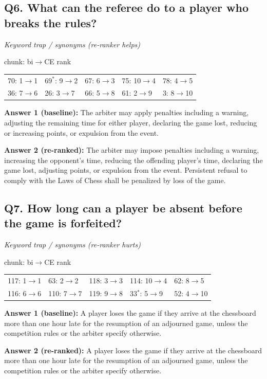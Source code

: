 \subsection*{Q6. What can the referee do to a player who breaks the rules?}
\emph{Keyword trap / synonyms (re-ranker helps)}\par
{\small chunk: bi$\to$CE rank\par\smallskip \begin{tabular}{@{}lllll@{}}
70: 1$\to$1 & 69$^*$: 9$\to$2 & 67: 6$\to$3 & 75: 10$\to$4 & 78: 4$\to$5 \\
36: 7$\to$6 & 26: 3$\to$7 & 66: 5$\to$8 & 61: 2$\to$9 & 3: 8$\to$10
\end{tabular}}\par\smallskip
\textbf{Answer 1 (baseline):} The arbiter may apply penalties including a warning, adjusting the remaining time for either player, declaring the game lost, reducing or increasing points, or expulsion from the event.\par
\textbf{Answer 2 (re-ranked):} The arbiter may impose penalties including a warning, increasing the opponent's time, reducing the offending player's time, declaring the game lost, adjusting points, or expulsion from the event. Persistent refusal to comply with the Laws of Chess shall be penalized by loss of the game.\par

\subsection*{Q7. How long can a player be absent before the game is forfeited?}
\emph{Keyword trap / synonyms (re-ranker hurts)}\par
{\small chunk: bi$\to$CE rank\par\smallskip \begin{tabular}{@{}lllll@{}}
117: 1$\to$1 & 63: 2$\to$2 & 118: 3$\to$3 & 114: 10$\to$4 & 62: 8$\to$5 \\
116: 6$\to$6 & 110: 7$\to$7 & 119: 9$\to$8 & 33$^*$: 5$\to$9 & 52: 4$\to$10
\end{tabular}}\par\smallskip
\textbf{Answer 1 (baseline):} A player loses the game if they arrive at the chessboard more than one hour late for the resumption of an adjourned game, unless the competition rules or the arbiter specify otherwise.\par
\textbf{Answer 2 (re-ranked):} A player loses the game if they arrive at the chessboard more than one hour late for the resumption of an adjourned game, unless the competition rules or the arbiter specify otherwise.\par

